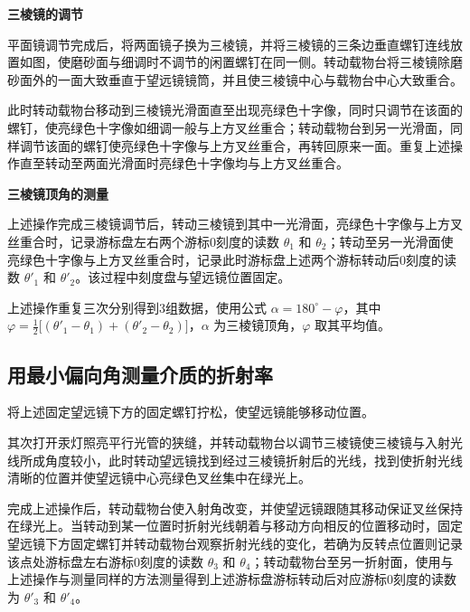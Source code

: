 \documentclass[UTF8]{ctexart}
\begin{document}
\textbf{三棱镜的调节}

平面镜调节完成后，将两面镜子换为三棱镜，并将三棱镜的三条边垂直螺钉连线放置如图，使磨砂面与细调时不调节的闲置螺钉在同一侧。转动载物台将三棱镜除磨砂面外的一面大致垂直于望远镜镜筒，并且使三棱镜中心与载物台中心大致重合。

此时转动载物台移动到三棱镜光滑面直至出现亮绿色十字像，同时只调节在该面的螺钉，使亮绿色十字像如细调一般与上方叉丝重合；转动载物台到另一光滑面，同样调节该面的螺钉使亮绿色十字像与上方叉丝重合，再转回原来一面。重复上述操作直至转动至两面光滑面时亮绿色十字像均与上方叉丝重合。


 \newpage
\textbf{三棱镜顶角的测量}

上述操作完成三棱镜调节后，转动三棱镜到其中一光滑面，亮绿色十字像与上方叉丝重合时，记录游标盘左右两个游标0刻度的读数 $\theta_1$ 和 $\theta_2$；转动至另一光滑面使亮绿色十字像与上方叉丝重合时，记录此时游标盘上述两个游标转动后0刻度的读数 $\theta'_1$ 和 $\theta'_2$。该过程中刻度盘与望远镜位置固定。

上述操作重复三次分别得到3组数据，使用公式  $\alpha = 180^{\circ} - \varphi $，其中$\varphi = \frac{1}{2}  \big[ (\theta'_1 - \theta_1 ) + (\theta'_2 - \theta_2 )\big]$，$\alpha$ 为三棱镜顶角，$\varphi$ 取其平均值。







\subsection{用最小偏向角测量介质的折射率}

将上述固定望远镜下方的固定螺钉拧松，使望远镜能够移动位置。

其次打开汞灯照亮平行光管的狭缝，并转动载物台以调节三棱镜使三棱镜与入射光线所成角度较小，此时转动望远镜找到经过三棱镜折射后的光线，找到使折射光线清晰的位置并使望远镜中心亮绿色叉丝集中在绿光上。

完成上述操作后，转动载物台使入射角改变，并使望远镜跟随其移动保证叉丝保持在绿光上。当转动到某一位置时折射光线朝着与移动方向相反的位置移动时，固定望远镜下方固定螺钉并转动载物台观察折射光线的变化，若确为反转点位置则记录该点处游标盘左右游标0刻度的读数 $\theta_3$ 和 $\theta_4$；转动载物台至另一折射面，使用与上述操作与测量同样的方法测量得到上述游标盘游标转动后对应游标0刻度的读数为 $\theta'_3$ 和 $\theta'_4$。
\end{document}
